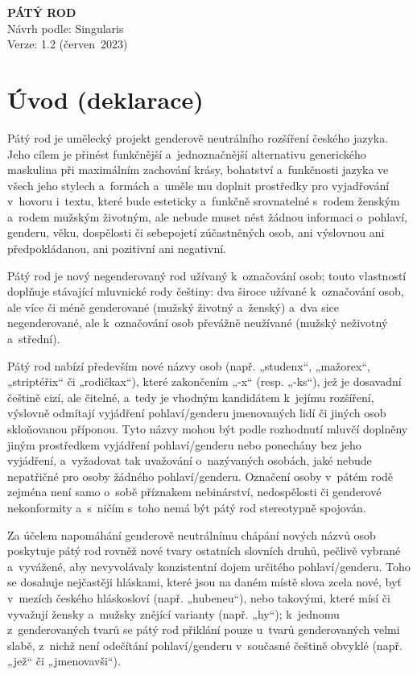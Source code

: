 \documentclass[10pt,draft]{article}
\begin{document}
\rmfamily%
%
%
\begin{center}%
{\Huge\bfseries PÁTÝ ROD\\}\medskip%
Návrh podle: Singularis\\%
Verze: 1.2 (červen 2023)
\end{center}%
\bigskip%
%
\section{Úvod (deklarace)}

Pátý rod je umělecký projekt genderově neutrálního rozšíření českého jazyka.
Jeho cílem je přinést funkčnější a jednoznačnější alternativu generického
maskulina při maximálním zachování krásy, bohatství a funkčnosti jazyka
ve všech jeho stylech a formách a uměle mu doplnit prostředky
pro vyjadřování v hovoru i textu, které bude esteticky
a funkčně srovnatelné s rodem ženským a rodem
mužským životným, ale nebude muset nést žádnou informaci o pohlaví, genderu,
věku, dospělosti či sebepojetí zúčastněných osob, ani výslovnou ani předpokládanou,
ani pozitivní ani negativní.

Pátý rod je nový negenderovaný rod užívaný k označování osob;
touto vlastností doplňuje stávající mluvnické rody češtiny:
dva široce užívané k označování osob, ale více či méně genderované
(mužský životný a ženský) a dva sice negenderované, ale k označování osob
převážně neužívané (mužský neživotný a střední).

Pátý rod nabízí především nové názvy osob (např. „studenx“, „mažorex“, „striptéřix“
či „rodičkax“), které zakončením „-x“ (resp. „-ks“), jež je dosavadní češtině cizí,
ale čitelné, a tedy je vhodným kandidátem k jejímu rozšíření, výslovně odmítají
vyjádření pohlaví/genderu jmenovaných lidí či jiných osob skloňovanou příponou.
Tyto názvy mohou být podle rozhodnutí mluvčí doplněny jiným prostředkem
vyjádření pohlaví/genderu nebo ponechány bez jeho vyjádření,
a vyžadovat tak uvažování o nazývaných osobách, jaké nebude nepatřičné
pro osoby žádného pohlaví/genderu. Označení osoby v pátém rodě
zejména není samo o sobě příznakem nebinárství, nedospělosti
či genderové nekonformity a s ničím s toho nemá být pátý rod stereotypně
spojován.

Za účelem napomáhání genderově neutrálnímu chápání nových názvů osob
poskytuje pátý rod rovněž nové tvary ostatních slovních druhů,
pečlivě vybrané a vyvážené, aby nevyvolávaly konzistentní dojem
určitého pohlaví/genderu. Toho se dosahuje nejčastěji hláskami,
které jsou na daném místě slova zcela nové, byť v mezích českého hláskosloví
(např. „hubeneu“), nebo takovými, které mísí či vyvažují žensky a mužsky znějící
varianty (např. „hy“); k jednomu z genderovaných tvarů se pátý rod přiklání
pouze u tvarů genderovaných velmi slabě, z nichž není odečítání pohlaví/genderu
v současné češtině obvyklé (např. „jež“ či „jmenovavši“).
\end{document}
